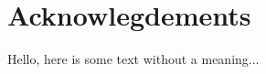 \documentclass[../main.tex]{subfiles}
\begin{document}
\section{Acknowlegdements}

Hello, here is some text without a meaning...
\end{document}

